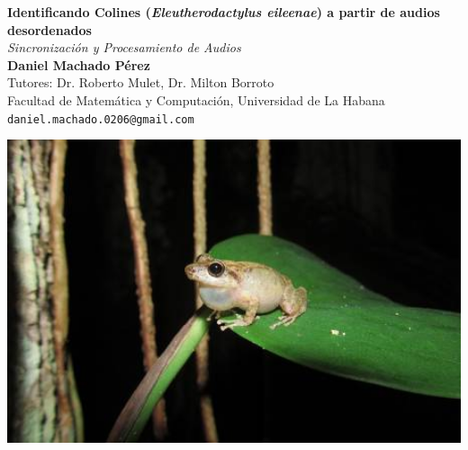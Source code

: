 \documentclass[a0,portrait]{a0poster}
\begin{document}


\begin{minipage}[b]{0.75\linewidth}
\veryHuge \color{NavyBlue} \textbf{Identificando Colines (\textit{Eleutherodactylus eileenae}) a partir de audios desordenados} \color{Black}\\ %
\Huge\textit{Sincronización y Procesamiento de Audios}\\[2cm] %
\huge \textbf{Daniel Machado Pérez}\\[0.5cm] %
\huge Tutores: Dr. Roberto Mulet, Dr. Milton Borroto\\[0.5cm] %
\huge Facultad de Matemática y Computación, Universidad de La Habana\\[0.4cm] %
\Large \texttt{daniel.machado.0206@gmail.com}\\
\end{minipage}
%
\begin{minipage}[b]{0.25\linewidth}
\includegraphics[width=20cm]{assets/elena.jpg}\\
\end{minipage}

\vspace{1cm} %
\end{document}
